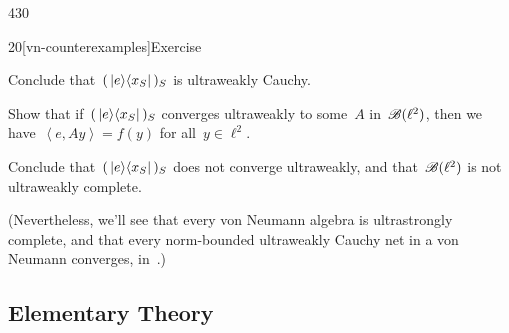 \begin{parsec}{430}
\begin{point}{20}[vn-counterexamples]{Exercise}
\begin{enumerate}
Conclude that~$(\,\left|e\right>\!\left<x_S\right|\,)_S$
is ultraweakly Cauchy.

Show that if~$(\,\left|e\right>\!\left<x_S\right|\,)_S$
converges ultraweakly to some~$A$ in~$\mathscr{B}(\ell^2)$,
then we have~$\left<e,Ay\right>=f(y)$
for all~$y\in\ell^2$.

Conclude that~$(\,\left|e\right>\!\left<x_S\right|\,)_S$
does not converge ultraweakly,
and that~$\mathscr{B}(\ell^2)$ is not ultraweakly complete.

(Nevertheless, we'll see that every von Neumann algebra
is ultrastrongly complete, and that
every norm-bounded ultraweakly Cauchy net
in a von Neumann converges, in~.)
\end{enumerate}
\end{point}
\end{parsec}
\subsection{Elementary Theory}
%
%

